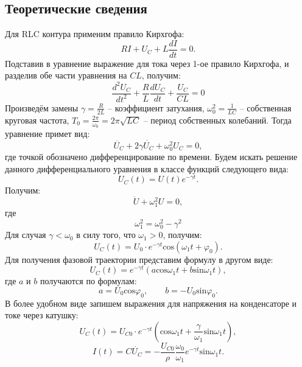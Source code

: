 \documentclass[a4paper,12pt]{article}
\theoremstyle{definition}
\begin{document}
\subsection*{Теоретические сведения}

\noindent Для RLC контура применим правило Кирхгофа:
\begin{equation}
    RI + U_C + L\frac{dI}{dt} = 0.
\end{equation}
Подставив в уравнение выражение для тока через 1-ое правило Кирхгофа, и разделив обе части уравнения на $CL$, получим:
\begin{equation}
    \frac{d^2U_C}{dt^2} + \frac{R}{L} \frac{dU_C}{dt} + \frac{U_C}{CL}=0
\end{equation}
Произведём замены $\gamma = \frac{R}{2L}$ -- коэффициент затухания, $\omega_0^2 = \frac{1}{LC}$ -- собственная круговая частота, $T_0 = \frac{2\pi}{\omega_0} = 2\pi \sqrt{LC}$ -- период собственных колебаний. Тогда уравнение примет вид:
\begin{equation}
    \ddot{U_C} + 2 \gamma \dot{U_C} + \omega_0^2U_C = 0,
\end{equation}
где точкой обозначено дифференцирование по времени. Будем искать решение данного дифференциального уравнения в классе функций следующего вида:
$$U_C(t) = U(t)e^{- \gamma t}.$$
Получим:
\begin{equation}
    \ddot{U} + \omega_1^2 U = 0,
\end{equation}
где
\begin{equation}
    \omega_1^2 = \omega_0^2-\gamma^2
\end{equation}
Для случая $\gamma < \omega_0$ в силу того, что $\omega_1 > 0$, получим:
\begin{equation}
    U_C(t) = U_0 \cdot e^{-\gamma t} \text{cos}(\omega_1 t + \varphi_0).
\end{equation}
Для получения фазовой траектории представим формулу в другом виде:
\begin{equation}
    U_C(t) = e^{-\gamma t}(a \text{cos} \omega_1 t + b \text{sin} \omega_1 t),
\end{equation}
где $a$ и $b$ получаются по формулам:
$$a = U_0 \text{cos} \varphi_0, \qquad b = - U_0 \text{sin} \varphi_0.$$
В более удобном виде запишем выражения для напряжения на конденсаторе и токе через катушку:
\begin{equation}
    U_C (t) = U_{C0} \cdot e^{-\gamma t} (\text{cos} \omega_1 t + \frac{\gamma}{\omega_1} \text{sin} \omega_1 t),
\end{equation}
\begin{equation}
    I(t) = C\dot{U_C}= - \frac{U_{C0}}{\rho} \frac{\omega_0}{\omega_1} e^{-\gamma t} \text{sin} \omega_1 t.
\end{equation}
\end{document}
